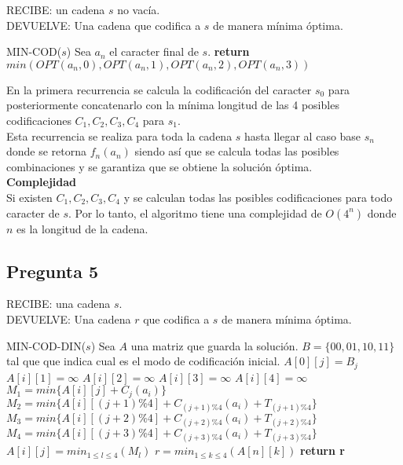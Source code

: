 \documentclass{article}
\begin{document}
\vspace{1cm}

\noindent RECIBE: un cadena $s$ no vacía.\\
DEVUELVE: Una cadena que codifica a $s$ de manera mínima óptima.
\begin{algorithmic}[1]
\item[]{MIN-COD($s$)}
\State Sea $a_n$ el caracter final de $s$.  
\State \textbf{return} $min(OPT(a_n,0), OPT(a_n,1), OPT(a_n,2), OPT(a_n,3))$  
\end{algorithmic}

En la primera recurrencia se calcula la codificación del caracter $s_0$ para posteriormente concatenarlo
con la mínima longitud de las 4 posibles codificaciones $C_1,C_2,C_3,C_4$ para $s_1$.\\
Esta recurrencia se realiza para toda la cadena $s$ hasta llegar al caso base $s_n$ donde se retorna $f_n(a_n)$
siendo así que se calcula todas las posibles combinaciones y se garantiza que se obtiene la solución óptima.\\

\textbf{Complejidad}\\
Si existen $C_1,C_2,C_3,C_4$ y se calculan todas las posibles codificaciones para todo caracter de $s$.
Por lo tanto, el algoritmo tiene una complejidad de $O(4^n)$ donde $n$ es la longitud de la cadena.



\subsection{Pregunta 5}
\noindent RECIBE: una cadena $s$.\\
DEVUELVE: Una cadena $r$ que codifica a $s$ de manera mínima óptima.

\begin{algorithmic}[1]
\item[]{MIN-COD-DIN($s$)}
\State Sea $A$ una matriz que guarda la solución.
\State $B=\{00, 01, 10, 11\}$ tal que que indica cual es el modo de codificación inicial.
    \State $A[0][j] = B_j$
\EndFor
{}
    \State $A[i][1] = \infty$
    \State $A[i][2] = \infty$
    \State $A[i][3] = \infty$
    \State $A[i][4] = \infty$
        \State $M_1 = min\{A[i][j] + C_j(a_i)\}$
        \State $M_2 = min\{A[i][(j+1)\%4] + C_{(j+1)\%4}(a_i) + T_{(j+1)\%4}\}$
        \State $M_3 = min\{A[i][(j+2)\%4] + C_{(j+2)\%4}(a_i) + T_{(j+2)\%4}\}$
        \State $M_4 = min\{A[i][(j+3)\%4] + C_{(j+3)\%4}(a_i) + T_{(j+3)\%4}\}$
        \State $A[i][j] = {min}_{1 \leq l \leq 4}(M_l)$
        \State
    \EndFor
\EndFor
\State $r = {min}_{1 \leq k \leq 4}(A[n][k])$
\State \textbf{return r}  
\end{algorithmic}
\end{document}
